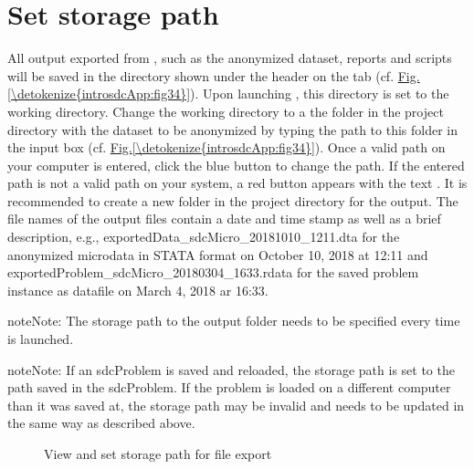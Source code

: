 \documentclass[letterpaper,10pt,english]{sphinxmanual}
\begin{document}
\section{Set storage path}
\label{\detokenize{introsdcApp:set-storage-path}}
All output exported from , such as the anonymized dataset, reports and scripts will be
saved in the directory shown under the header  on the 
tab (cf. \hyperref[\detokenize{introsdcApp:fig34}]{Fig.\@ \ref{\detokenize{introsdcApp:fig34}}}). Upon launching , this directory is set to the  working
directory. Change the working directory to a the folder in the project directory with the
dataset to be anonymized by typing the path to this folder in the input box (cf. \hyperref[\detokenize{introsdcApp:fig34}]{Fig.\@ \ref{\detokenize{introsdcApp:fig34}}}).
Once a valid path on your computer is entered, click the blue button  to change the path. If the entered path is not a valid path on your system, a red button appears
with the text .
It is recommended to create a new folder in the project directory for the  output.
The file names of the output files contain a date and time stamp as well as a brief description,
e.g., exportedData\_sdcMicro\_20181010\_1211.dta for the anonymized microdata in STATA format
on October 10, 2018 at 12:11 and exportedProblem\_sdcMicro\_20180304\_1633.rdata for the
saved problem instance as  datafile on March 4, 2018 ar 16:33.

\begin{sphinxadmonition}{note}{Note:}
The storage path to the output folder needs to be specified every time  is
launched.
\end{sphinxadmonition}

\begin{sphinxadmonition}{note}{Note:}
If an sdcProblem is saved and reloaded, the storage path is set to the path saved
in the sdcProblem. If the problem is loaded on a different computer than it was saved at,
the storage path may be invalid and needs to be updated in the same way as described above.
\end{sphinxadmonition}

\begin{figure}[htbp]
\centering
\capstart

\noindent{}
\caption{View and set storage path for file export}\label{\detokenize{introsdcApp:fig34}}\label{\detokenize{introsdcApp:id5}}\end{figure}
\end{document}
